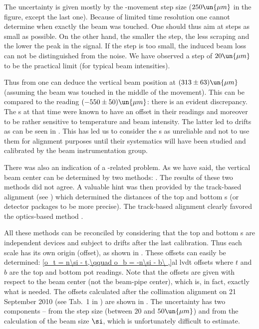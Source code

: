 The uncertainty is given mostly by the -movement step size ($250\un{\mu m}$ in the figure, except the last one). Because of limited time resolution one cannot determine when exactly the beam was touched. One should thus aim at steps as small as possible. On the other hand, the smaller the step, the less scraping and the lower the peak in the  signal. If the step is too small, the induced beam loss can not be distinguished from the noise. We have observed a step of $20\un{\mu m}$ to be the practical limit (for typical beam intensities).


Thus from  one can deduce the vertical beam position at $(313\pm 63)\un{\mu m}$ (assuming the beam was touched in the middle of the movement). This can be compared to the  reading $(-550\pm50)\un{\mu m}$: there is an evident discrepancy. The s at that time were known to have an offset in their readings and moreover to be rather sensitive to temperature and beam intensity. The latter led to drifts as can be seen in . This has led us to consider the s as unreliable and not to use them for alignment purposes until their systematics will have been studied and calibrated by the beam instrumentation group.


There was also an indication of a -related problem. As we have said, the vertical beam center can be determined by two methods: . The results of these two methods did not agree. A valuable hint was then provided by the track-based alignment (see ) which determined the distances of the top and bottom s (or detector packages to be more precise). The track-based alignment clearly favored the optics-based method .

All these methods can be reconciled by considering that the top and bottom s are independent devices and subject to drifts after the last calibration. Thus each  scale has its own origin (offset), as shown in . These offsets can easily be determined:
\eqref{o_t = n\si - t,\qquad o_b = -n\si - b\ ,}{al lvdt offsets}
where $t$ and $b$ are the top and bottom pot  readings. Note that the offsets are given with respect to the beam center (not the beam-pipe center), which is, in fact, exactly what is needed. The offsets calculated after the collimation alignment on 21 September 2010 (see Tab.~1 in ) are shown in . The uncertainty has two components -- from the step size (between $20$ and $50\un{\mu m}$) and from the calculation of the beam size $\si$, which is unfortunately difficult to estimate.

